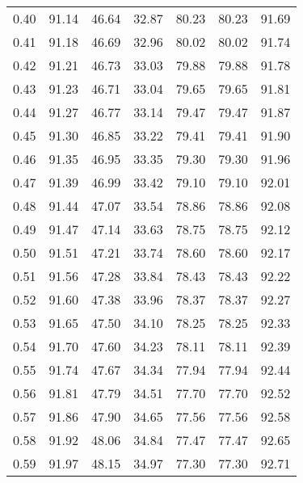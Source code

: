 \begin{tabular}{|c|c|c|c|c|c|c|}
      0.40 &     91.14 &     46.64 &      32.87 &   80.23 &      80.23 &         91.69 \\
      0.41 &     91.18 &     46.69 &      32.96 &   80.02 &      80.02 &         91.74 \\
      0.42 &     91.21 &     46.73 &      33.03 &   79.88 &      79.88 &         91.78 \\
      0.43 &     91.23 &     46.71 &      33.04 &   79.65 &      79.65 &         91.81 \\
      0.44 &     91.27 &     46.77 &      33.14 &   79.47 &      79.47 &         91.87 \\
      0.45 &     91.30 &     46.85 &      33.22 &   79.41 &      79.41 &         91.90 \\
      0.46 &     91.35 &     46.95 &      33.35 &   79.30 &      79.30 &         91.96 \\
      0.47 &     91.39 &     46.99 &      33.42 &   79.10 &      79.10 &         92.01 \\
      0.48 &     91.44 &     47.07 &      33.54 &   78.86 &      78.86 &         92.08 \\
      0.49 &     91.47 &     47.14 &      33.63 &   78.75 &      78.75 &         92.12 \\
      0.50 &     91.51 &     47.21 &      33.74 &   78.60 &      78.60 &         92.17 \\
      0.51 &     91.56 &     47.28 &      33.84 &   78.43 &      78.43 &         92.22 \\
      0.52 &     91.60 &     47.38 &      33.96 &   78.37 &      78.37 &         92.27 \\
      0.53 &     91.65 &     47.50 &      34.10 &   78.25 &      78.25 &         92.33 \\
      0.54 &     91.70 &     47.60 &      34.23 &   78.11 &      78.11 &         92.39 \\
      0.55 &     91.74 &     47.67 &      34.34 &   77.94 &      77.94 &         92.44 \\
      0.56 &     91.81 &     47.79 &      34.51 &   77.70 &      77.70 &         92.52 \\
      0.57 &     91.86 &     47.90 &      34.65 &   77.56 &      77.56 &         92.58 \\
      0.58 &     91.92 &     48.06 &      34.84 &   77.47 &      77.47 &         92.65 \\
      0.59 &     91.97 &     48.15 &      34.97 &   77.30 &      77.30 &         92.71 \\

\end{tabular}
